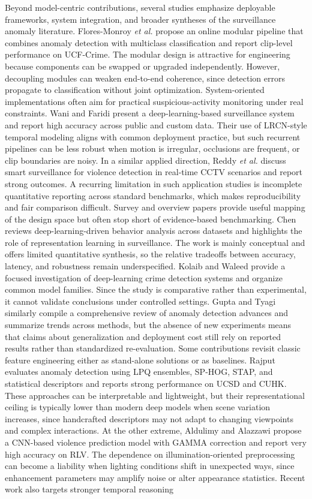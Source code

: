 \documentclass[AMA,Times1COL]{WileyNJDv5} %
\begin{document}
Beyond model-centric contributions, several studies emphasize deployable frameworks, system integration, and broader syntheses of the surveillance anomaly literature. Flores-Monroy \textit{et al.} \cite{b23} propose an online modular pipeline that combines anomaly detection with multiclass classification and report clip-level performance on UCF-Crime. The modular design is attractive for engineering because components can be swapped or upgraded independently. However, decoupling modules can weaken end-to-end coherence, since detection errors propagate to classification without joint optimization. System-oriented implementations often aim for practical suspicious-activity monitoring under real constraints. Wani and Faridi \cite{b24} present a deep-learning-based surveillance system and report high accuracy across public and custom data. Their use of LRCN-style temporal modeling aligns with common deployment practice, but such recurrent pipelines can be less robust when motion is irregular, occlusions are frequent, or clip boundaries are noisy. In a similar applied direction, Reddy \textit{et al.} \cite{b25} discuss smart surveillance for violence detection in real-time CCTV scenarios and report strong outcomes. A recurring limitation in such application studies is incomplete quantitative reporting across standard benchmarks, which makes reproducibility and fair comparison difficult. Survey and overview papers provide useful mapping of the design space but often stop short of evidence-based benchmarking. Chen \cite{b26} reviews deep-learning-driven behavior analysis across datasets and highlights the role of representation learning in surveillance. The work is mainly conceptual and offers limited quantitative synthesis, so the relative tradeoffs between accuracy, latency, and robustness remain underspecified. Kolaib and Waleed \cite{b27} provide a focused investigation of deep-learning crime detection systems and organize common model families. Since the study is comparative rather than experimental, it cannot validate conclusions under controlled settings. Gupta and Tyagi \cite{b28} similarly compile a comprehensive review of anomaly detection advances and summarize trends across methods, but the absence of new experiments means that claims about generalization and deployment cost still rely on reported results rather than standardized re-evaluation. Some contributions revisit classic feature engineering either as stand-alone solutions or as baselines. Rajput \cite{b29} evaluates anomaly detection using LPQ ensembles, SP-HOG, STAP, and statistical descriptors and reports strong performance on UCSD and CUHK. These approaches can be interpretable and lightweight, but their representational ceiling is typically lower than modern deep models when scene variation increases, since handcrafted descriptors may not adapt to changing viewpoints and complex interactions. At the other extreme, Aldulimy and Alazzawi \cite{b30} propose a CNN-based violence prediction model with GAMMA correction and report very high accuracy on RLV. The dependence on illumination-oriented preprocessing can become a liability when lighting conditions shift in unexpected ways, since enhancement parameters may amplify noise or alter appearance statistics. Recent work also targets stronger temporal reasoning 
\end{document}
